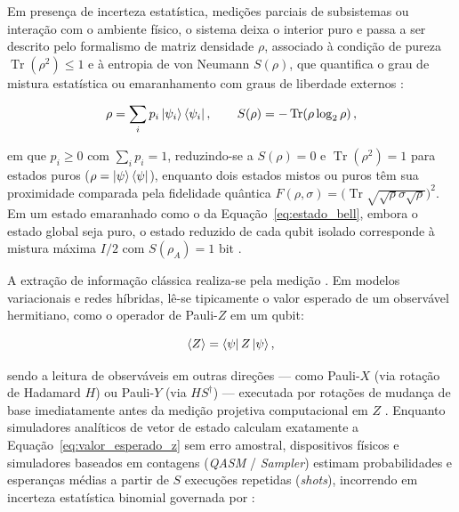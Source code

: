\documentclass[
    12pt,
    openright,
    oneside,
    a4paper,
    english,
    brazil
]{abntex2}
\begin{document}
Em presença de incerteza estatística, medições parciais de subsistemas ou interação com o ambiente físico, o sistema deixa o interior puro e passa a ser descrito pelo formalismo de matriz densidade \(\rho\), associado à condição de pureza \(\operatorname{Tr}(\rho^2) \le 1\) e à entropia de von Neumann \(S(\rho)\), que quantifica o grau de mistura estatística ou emaranhamento com graus de liberdade externos \cite{nielsen2010quantum}:

\begin{equation}
\label{eq:matriz_densidade}
\rho = \sum_{i} p_i \ket{\psi_i}\bra{\psi_i},
\qquad
S(\rho) = -\operatorname{Tr}\!\left(\rho \log_2 \rho\right),
\end{equation}

em que \(p_i \ge 0\) com \(\sum_i p_i = 1\), reduzindo-se a \(S(\rho)=0\) e \(\operatorname{Tr}(\rho^2)=1\) para estados puros (\(\rho=\ket{\psi}\bra{\psi}\)), enquanto dois estados mistos ou puros têm sua proximidade comparada pela fidelidade quântica \(F(\rho,\sigma) = \bigl(\operatorname{Tr}\sqrt{\sqrt{\rho}\sigma\sqrt{\rho}}\bigr)^2\). Em um estado emaranhado como o da Equação~\eqref{eq:estado_bell}, embora o estado global seja puro, o estado reduzido de cada qubit isolado corresponde à mistura máxima \(I/2\) com \(S(\rho_A) = 1\text{ bit}\) \cite{nielsen2010quantum}.

A extração de informação clássica realiza-se pela medição \cite{nielsen2010quantum,ibmQuantumMeasureQubits2026}. Em modelos variacionais e redes híbridas, lê-se tipicamente o valor esperado de um observável hermitiano, como o operador de Pauli-\(Z\) em um qubit:

\begin{equation}
\label{eq:valor_esperado_z}
\langle Z \rangle =
\bra{\psi} Z \ket{\psi},
\end{equation}

sendo a leitura de observáveis em outras direções — como Pauli-\(X\) (via rotação de Hadamard \(H\)) ou Pauli-\(Y\) (via \(H S^\dagger\)) — executada por rotações de mudança de base imediatamente antes da medição projetiva computacional em \(Z\) \cite{ibmQuantumMeasureQubits2026}. Enquanto simuladores analíticos de vetor de estado calculam exatamente a Equação~\eqref{eq:valor_esperado_z} sem erro amostral, dispositivos físicos e simuladores baseados em contagens (\textit{QASM} / \textit{Sampler}) estimam probabilidades e esperanças médias a partir de \(S\) execuções repetidas (\textit{shots}), incorrendo em incerteza estatística binomial governada por \cite{ibmQuantumMeasureQubits2026,cerezo2021variational}:
\end{document}
